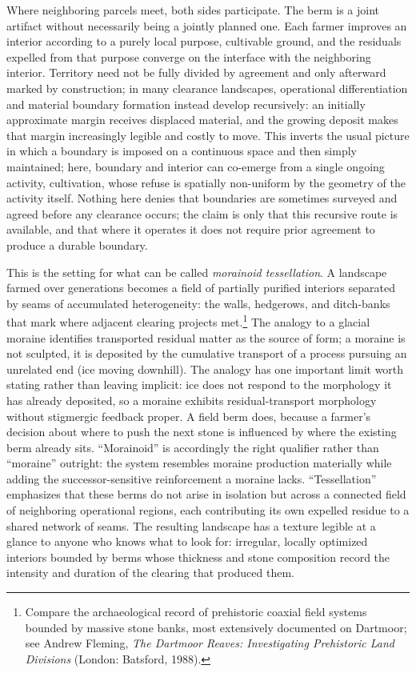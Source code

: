 \documentclass[11pt]{article}
\begin{document}
Where neighboring parcels meet, both sides participate. The berm is a joint artifact without necessarily being a jointly planned one. Each farmer improves an interior according to a purely local purpose, cultivable ground, and the residuals expelled from that purpose converge on the interface with the neighboring interior. Territory need not be fully divided by agreement and only afterward marked by construction; in many clearance landscapes, operational differentiation and material boundary formation instead develop recursively: an initially approximate margin receives displaced material, and the growing deposit makes that margin increasingly legible and costly to move. This inverts the usual picture in which a boundary is imposed on a continuous space and then simply maintained; here, boundary and interior can co-emerge from a single ongoing activity, cultivation, whose refuse is spatially non-uniform by the geometry of the activity itself. Nothing here denies that boundaries are sometimes surveyed and agreed before any clearance occurs; the claim is only that this recursive route is available, and that where it operates it does not require prior agreement to produce a durable boundary.

This is the setting for what can be called \emph{morainoid tessellation}. A landscape farmed over generations becomes a field of partially purified interiors separated by seams of accumulated heterogeneity: the walls, hedgerows, and ditch-banks that mark where adjacent clearing projects met.\footnote{Compare the archaeological record of prehistoric coaxial field systems bounded by massive stone banks, most extensively documented on Dartmoor; see Andrew Fleming, \emph{The Dartmoor Reaves: Investigating Prehistoric Land Divisions} (London: Batsford, 1988).} The analogy to a glacial moraine identifies transported residual matter as the source of form; a moraine is not sculpted, it is deposited by the cumulative transport of a process pursuing an unrelated end (ice moving downhill). The analogy has one important limit worth stating rather than leaving implicit: ice does not respond to the morphology it has already deposited, so a moraine exhibits residual-transport morphology without stigmergic feedback proper. A field berm does, because a farmer's decision about where to push the next stone is influenced by where the existing berm already sits. ``Morainoid'' is accordingly the right qualifier rather than ``moraine'' outright: the system resembles moraine production materially while adding the successor-sensitive reinforcement a moraine lacks. ``Tessellation'' emphasizes that these berms do not arise in isolation but across a connected field of neighboring operational regions, each contributing its own expelled residue to a shared network of seams. The resulting landscape has a texture legible at a glance to anyone who knows what to look for: irregular, locally optimized interiors bounded by berms whose thickness and stone composition record the intensity and duration of the clearing that produced them.
\end{document}
